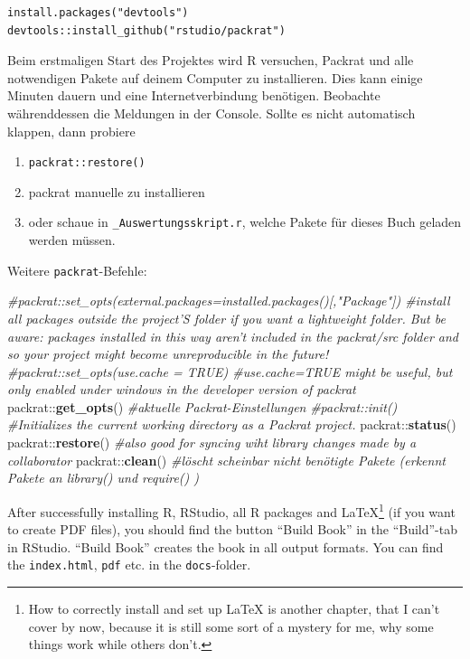 \documentclass[]{book}
\makeatletter
\newenvironment{Shaded}{\begin{snugshade}}{\end{snugshade}}
\newcommand{\KeywordTok}[1]{\textcolor[rgb]{0.13,0.29,0.53}{\textbf{{#1}}}}
\newcommand{\CommentTok}[1]{\textcolor[rgb]{0.56,0.35,0.01}{\textit{{#1}}}}
\newcommand{\NormalTok}[1]{{#1}}
\providecommand{\tightlist}{%
  \setlength{\itemsep}{0pt}\setlength{\parskip}{0pt}}
\let\rmarkdownfootnote\footnote%
\def\footnote{\protect\rmarkdownfootnote}
\newenvironment{kframe}{%
\medskip{}
\setlength{\fboxsep}{.8em}
 \def\at@end@of@kframe{}%
 \ifinner\ifhmode%
  \def\at@end@of@kframe{\end{minipage}}%
  \begin{minipage}{\columnwidth}%
 \fi\fi%
 \def\FrameCommand##1{\hskip\@totalleftmargin \hskip-\fboxsep
 \colorbox{shadecolor}{##1}\hskip-\fboxsep
     \hskip-\linewidth \hskip-\@totalleftmargin \hskip\columnwidth}%
 \MakeFramed {\advance\hsize-\width
   \@totalleftmargin\z@ \linewidth\hsize
   \@setminipage}}%
 {\par\unskip\endMakeFramed%
 \at@end@of@kframe}
\renewenvironment{Shaded}{\begin{kframe}}{\end{kframe}}
\theoremstyle{definition}
\theoremstyle{definition}
\theoremstyle{remark}
\let\BeginKnitrBlock\begin \let\EndKnitrBlock\end
\makeatother
\begin{document}
\begin{verbatim}
install.packages("devtools")
devtools::install_github("rstudio/packrat")
\end{verbatim}

\BeginKnitrBlock{rmdcaution}
Beim erstmaligen Start des Projektes wird R versuchen, Packrat und alle
notwendigen Pakete auf deinem Computer zu installieren. Dies kann einige
Minuten dauern und eine Internetverbindung benötigen. Beobachte
währenddessen die Meldungen in der Console. Sollte es nicht automatisch
klappen, dann probiere

\begin{enumerate}
\def\labelenumi{\alph{enumi})}
\tightlist
\item
  \texttt{packrat::restore()}
\item
  packrat manuelle zu installieren
\item
  oder schaue in \texttt{\_Auswertungsskript.r}, welche Pakete für
  dieses Buch geladen werden müssen.
\end{enumerate}
\EndKnitrBlock{rmdcaution}

Weitere \texttt{packrat}-Befehle:

\begin{Shaded}
\begin{Highlighting}[]
\CommentTok{#packrat::set_opts(external.packages=installed.packages()[,"Package"])  #install all packages outside the project'S folder if you want a lightweight folder. But be aware: packages installed in this way aren't included in the packrat/src folder and so your project might become unreproducible in the future!}
\CommentTok{#packrat::set_opts(use.cache = TRUE)  #use.cache=TRUE might be useful, but only enabled under windows in the developer version of packrat}
\NormalTok{packrat::}\KeywordTok{get_opts}\NormalTok{()  }\CommentTok{#aktuelle Packrat-Einstellungen}
\CommentTok{#packrat::init()  #Initializes the current working directory as a Packrat project.}
\NormalTok{packrat::}\KeywordTok{status}\NormalTok{()}
\NormalTok{packrat::}\KeywordTok{restore}\NormalTok{()  }\CommentTok{#also good for syncing wiht library changes made by a collaborator}
\NormalTok{packrat::}\KeywordTok{clean}\NormalTok{()  }\CommentTok{#löscht scheinbar nicht benötigte Pakete (erkennt Pakete an library() und require() )}
\end{Highlighting}
\end{Shaded}

After successfully installing R, RStudio, all R packages and
LaTeX\footnote{How to correctly install and set up LaTeX is another
  chapter, that I can't cover by now, because it is still some sort of a
  mystery for me, why some things work while others don't.} (if you want
to create PDF files), you should find the button ``Build Book'' in the
``Build''-tab in RStudio. ``Build Book'' creates the book in all output
formats. You can find the \texttt{index.html}, \texttt{pdf} etc. in the
\texttt{docs}-folder.
\end{document}
